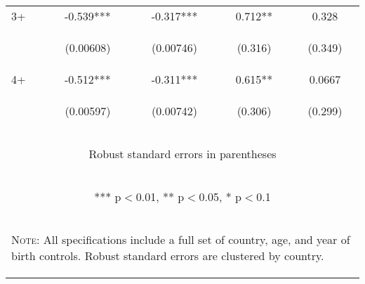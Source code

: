 \documentclass{article}[11pt,subeqn]
\begin{document}
\begin{spacing}{1.25}
\begin{table}[!htbp]
\begin{center}
\begin{tabular}{lcccc}
3+ &-0.539*** & -0.317*** & 0.712** & 0.328 \\
\vspace{4pt} & \begin{footnotesize}(0.00608)\end{footnotesize}& \begin{footnotesize}(0.00746)\end{footnotesize} & \begin{footnotesize}(0.316)\end{footnotesize} & \begin{footnotesize}(0.349)\end{footnotesize}  \\
4+ & -0.512*** & -0.311*** & 0.615** & 0.0667 \\
\vspace{4pt} & \begin{footnotesize}(0.00597)\end{footnotesize} & \begin{footnotesize}(0.00742)\end{footnotesize} & \begin{footnotesize}(0.306)\end{footnotesize} & \begin{footnotesize}(0.299)\end{footnotesize} \\
\midrule
\multicolumn{5}{c}{\begin{footnotesize} Robust standard errors in parentheses\end{footnotesize}} \\
\multicolumn{5}{c}{\begin{footnotesize} *** p$<$0.01, ** p$<$0.05, * p$<$0.1\end{footnotesize}} \\
\bottomrule 
\multicolumn{5}{p{10cm}}{\setstretch{0.9}\begin{footnotesize}\textsc{Note:} All specifications include a full set of country, age, and year of birth controls. Robust standard errors are clustered by country.\end{footnotesize}}\\

\end{tabular}
\end{center}
\end{table}



\end{spacing}
\end{document}
